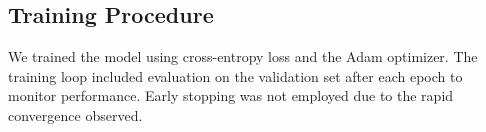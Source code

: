 \documentclass{article} %
\theoremstyle{plain}
\begin{document}
\subsection{Training Procedure}

We trained the model using cross-entropy loss and the Adam optimizer. The training loop included evaluation on the validation set after each epoch to monitor performance. Early stopping was not employed due to the rapid convergence observed.
\end{document}
